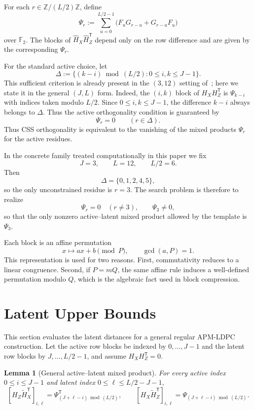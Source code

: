 \documentclass[11pt]{article}
\newcommand{\Ftwo}{\mathbb{F}_2}
\newcommand{\Z}{\mathbb{Z}}
\newcommand{\Hhat}{\hat{H}}
\newcommand{\Htil}{\tilde{H}}
\theoremstyle{uprightthm}
\newtheorem{lemma}[theorem]{Lemma}
\begin{document}
For each $r\in \Z/(L/2)\Z$, define
\[
\Psi_r:=\sum_{u=0}^{L/2-1}\bigl(F_uG_{r-u}+G_{r-u}F_u\bigr)
\]
over $\Ftwo$.
The blocks of $\Hhat_X\Hhat_Z^{\mathsf T}$ depend only on the row difference and are given by the corresponding $\Psi_r$.

For the standard active choice, let
\[
\Delta:=\{(k-i)\bmod(L/2):0\le i,k\le J-1\}.
\]
This sufficient criterion is already present in the $(3,12)$ setting of~\cite{Kasai2026}; here we state it in the general $(J,L)$ form.
Indeed, the $(i,k)$ block of $H_XH_Z^{\mathsf T}$ is $\Psi_{k-i}$ with indices taken modulo $L/2$.
Since $0\le i,k\le J-1$, the difference $k-i$ always belongs to $\Delta$.
Thus the active orthogonality condition is guaranteed by
\[
\Psi_r=0\qquad (r\in\Delta).
\]
Thus CSS orthogonality is equivalent to the vanishing of the mixed products
$\Psi_r$ for the active residues.

In the concrete family treated computationally in this paper we fix
\[
J=3,\qquad L=12,\qquad L/2=6.
\]
Then
\[
\Delta=\{0,1,2,4,5\},
\]
so the only unconstrained residue is $r=3$. The search problem is therefore to realize
\[
\Psi_r=0\quad (r\neq 3),\qquad \Psi_3\neq 0,
\]
so that the only nonzero active--latent mixed product allowed by the template is
$\Psi_3$.

Each block is an affine permutation
\[
x\mapsto ax+b\pmod P,\qquad \gcd(a,P)=1.
\]
This representation is used for two reasons. First, commutativity reduces to a
linear congruence. Second, if $P=mQ$, the same affine rule induces a
well-defined permutation modulo $Q$, which is the algebraic fact used in block
compression.

\section{Latent Upper Bounds}
\label{sec:latent-en}
This section evaluates the latent distances for a general regular APM-LDPC
construction.  Let the active row blocks be indexed by $0,\dots,J-1$ and the
latent row blocks by $J,\dots,L/2-1$, and assume $H_XH_Z^{\mathsf T}=0$.

\begin{lemma}[General active--latent mixed product]
\label{lem:latent-mixed-product-en}
For every active index $0\le i\le J-1$ and latent index $0\le \ell\le L/2-J-1$,
\[
[H_Z\Htil_X^{\mathsf T}]_{i,\ell}
=\Psi_{(J+\ell-i)\bmod (L/2)}^{\mathsf T},
\qquad
[H_X\Htil_Z^{\mathsf T}]_{i,\ell}
=\Psi_{(J+\ell-i)\bmod (L/2)}.
\]
\end{lemma}
\end{document}
